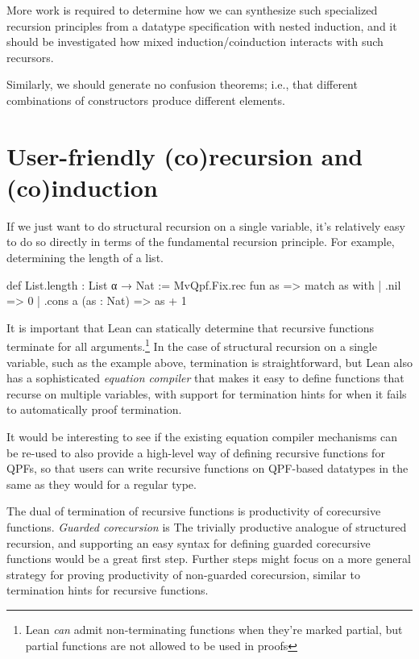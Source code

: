 More work is required to determine how we can synthesize such specialized recursion principles from
a datatype specification with nested induction, and it should be investigated how mixed induction/coinduction
interacts with such recursors.

Similarly, we should generate no confusion theorems; i.e., that different combinations of constructors
produce different elements.



\section{User-friendly (co)recursion and (co)induction}
If we just want to do structural recursion on a single variable, it's relatively easy to do so directly
in terms of the fundamental recursion principle.
For example, determining the length of a list.
\begin{leancode}
def List.length : List α → Nat :=
  MvQpf.Fix.rec fun as => match as with
    | .nil                => 0
    | .cons a (as : Nat)  => as + 1 
\end{leancode}

It is important that Lean can statically determine that recursive functions terminate for all 
arguments.\footnote{Lean \emph{can} admit non-terminating functions when they're marked partial, but partial functions are not allowed to be used in proofs}
In the case of structural recursion on a single variable, such as the example above, termination is straightforward,
but Lean also has a sophisticated \emph{equation compiler} that makes it easy to define functions that recurse
on multiple variables, with support for termination hints for when it fails to automatically proof
termination.

It would be interesting to see if the existing equation compiler mechanisms can be re-used
to also provide a high-level way of defining recursive functions for QPFs, so that users can write
recursive functions on QPF-based datatypes in the same as they would for a regular \inductive{} type.

The dual of termination of recursive functions is productivity of corecursive functions.
\emph{Guarded corecursion} is The trivially productive analogue of structured recursion, 
and supporting an easy syntax for defining guarded corecursive functions would be a great first step.
Further steps might focus on a more general strategy for proving productivity of non-guarded corecursion,
similar to termination hints for recursive functions.

